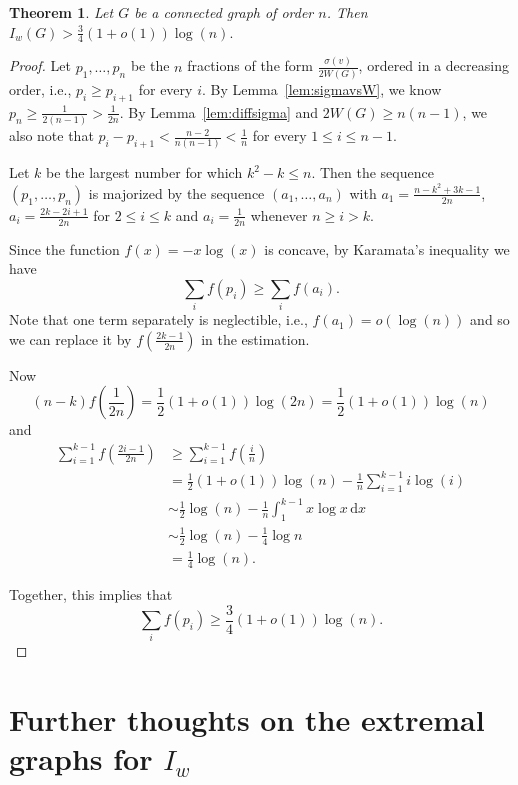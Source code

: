 \documentclass{article}
\newtheorem{thr}[defi]{Theorem}
\def \d{\, \mathrm{d}}
\begin{document}
{\begin{thr}\label{thr:minIw_as}
    Let $G$ be a connected graph of order $n$.
    Then $I_w(G) > \frac 34 (1+o(1))\log (n).$
\end{thr}

\begin{proof}
    Let $p_1, \ldots, p_n$ be the $n$ fractions of the form $\frac{\sigma(v)}{2W(G)}$, ordered in a decreasing order, i.e., $p_i \ge p_{i+1}$ for every $i$.
    By Lemma~\ref{lem:sigmavsW}, we know $p_n \ge \frac{1}{2(n-1)}>\frac 1{2n}.$
    By Lemma~\ref{lem:diffsigma} and $2W(G) \ge n(n-1)$, we also note that $p_i - p_{i+1} < \frac{n-2}{n(n-1)}<\frac 1n$ for every $1 \le i \le n-1.$
    
    Let $k$ be the largest number for which $k^2-k \le n.$
    Then the sequence $(p_1, \ldots, p_n)$ is majorized by the sequence $(a_1, \ldots, a_n)$ with $a_1=\frac{n-k^2+3k-1}{2n}$, $a_i = \frac{2k-2i+1}{2n}$ for $2 \le i \le k$ and $a_i=\frac{1}{2n}$ whenever $n \ge i>k.$
    
    Since the function $f(x)=-x \log(x)$ is concave, by Karamata's inequality we have 
    $$\sum_i f(p_i) \ge \sum_i f(a_i).$$
    Note that one term separately is neglectible, i.e., $f(a_1) = o(\log(n))$ and so we can replace it by $f\left( \frac{2k-1}{2n} \right)$ in the estimation.
    
    Now 
    $$(n-k)f\left( \frac{1}{2n} \right) =\frac{1}{2}(1+o(1)) \log(2n)=\frac{1}{2}(1+o(1)) \log(n)$$
    and
    \begin{align*}
        \sum_{i=1}^{k-1} f\left( \frac{2i-1}{2n} \right) &\ge
        \sum_{i=1}^{k-1} f\left( \frac{i}{n} \right)\\
        &=
        \frac 12 (1+o(1)) \log(n) - \frac{1}{n} \sum_{i=1}^{k-1} i \log(i)\\
        &\sim \frac 12 \log(n) - \frac 1n \int_1^{k-1} x \log x \d x\\
        &\sim  \frac 12 \log(n) -\frac 14 \log n\\
        &= \frac 14 \log(n).
    \end{align*}
    
    Together, this implies that $$\sum_i f(p_i) \ge \frac 34 (1+o(1)) \log (n).$$
\end{proof}

\section{Further thoughts on the extremal graphs for $I_w$}\label{minIw_extrG_ft}

}
\end{document}
